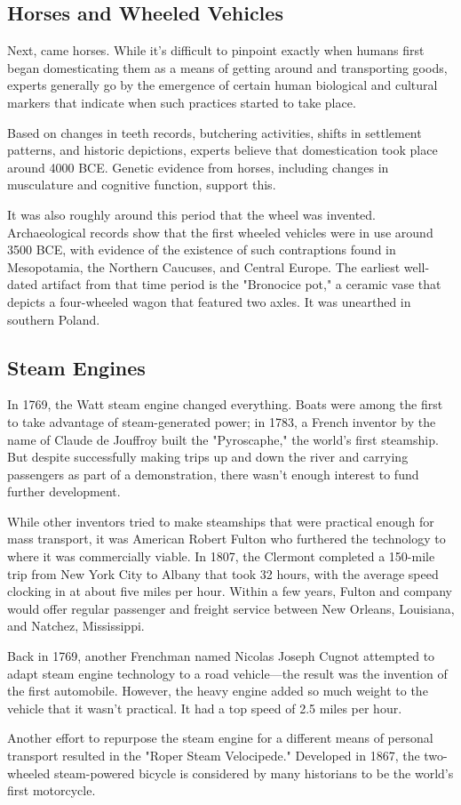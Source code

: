 \subsection*{Horses and Wheeled Vehicles}
\par
Next, came horses. While it’s difficult to pinpoint exactly when humans first began domesticating them as a means of getting around and transporting goods, experts generally go by the emergence of certain human biological and cultural markers that indicate when such practices started to take place.
\par
Based on changes in teeth records, butchering activities, shifts in settlement patterns, and historic depictions, experts believe that domestication took place around 4000 BCE. Genetic evidence from horses, including changes in musculature and cognitive function, support this.
\par
It was also roughly around this period that the wheel was invented. Archaeological records show that the first wheeled vehicles were in use around 3500 BCE, with evidence of the existence of such contraptions found in Mesopotamia, the Northern Caucuses, and Central Europe. The earliest well-dated artifact from that time period is the "Bronocice pot," a ceramic vase that depicts a four-wheeled wagon that featured two axles. It was unearthed in southern Poland.
\\
\subsection*{Steam Engines}
\par
In 1769, the Watt steam engine changed everything. Boats were among the first to take advantage of steam-generated power; in 1783, a French inventor by the name of Claude de Jouffroy built the "Pyroscaphe," the world’s first steamship. But despite successfully making trips up and down the river and carrying passengers as part of a demonstration, there wasn’t enough interest to fund further development.
\par
While other inventors tried to make steamships that were practical enough for mass transport, it was American Robert Fulton who furthered the technology to where it was commercially viable. In 1807, the Clermont completed a 150-mile trip from New York City to Albany that took 32 hours, with the average speed clocking in at about five miles per hour. Within a few years, Fulton and company would offer regular passenger and freight service between New Orleans, Louisiana, and Natchez, Mississippi.
\par
Back in 1769, another Frenchman named Nicolas Joseph Cugnot attempted to adapt steam engine technology to a road vehicle—the result was the invention of the first automobile. However, the heavy engine added so much weight to the vehicle that it wasn't practical. It had a top speed of 2.5 miles per hour.
\par
Another effort to repurpose the steam engine for a different means of personal transport resulted in the "Roper Steam Velocipede." Developed in 1867, the two-wheeled steam-powered bicycle is considered by many historians to be the world’s first motorcycle.
\\
